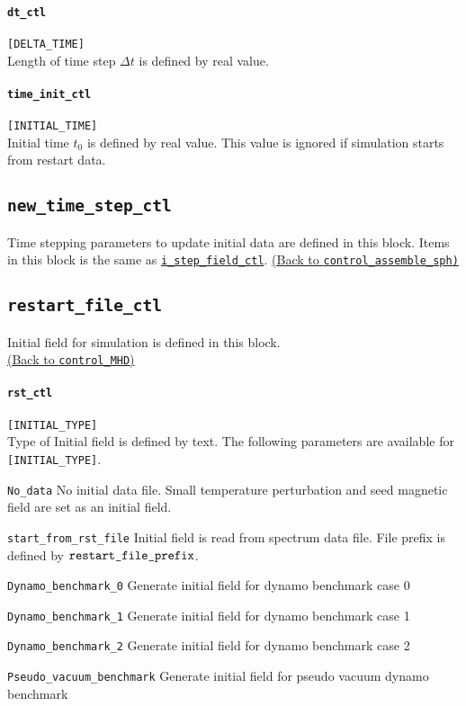 \paragraph{\tt dt\_ctl}
\label{href_t:dt_ctl}
\verb|[DELTA_TIME]| \\
Length of time step $\Delta t$ is defined by real value.

\paragraph{\tt time\_init\_ctl}
\label{href_t:time_init_ctl}
\verb|[INITIAL_TIME]| \\
Initial time $t_{0}$ is defined by real value. This value is ignored if simulation starts from restart data.

\subsection{\tt new\_time\_step\_ctl}
\label{href_t:new_time_step_ctl}
Time stepping parameters to update initial data are defined in this block. Items in this block is the same as \hyperref[href_t:i_step_field_ctl]{\tt i\_step\_field\_ctl}.
\hyperref[href_i:new_time_step_ctl]{(Back to {\tt control\_assemble\_sph)}}


\subsection{\tt restart\_file\_ctl}
\label{href_t:restart_file_ctl}
Initial field for simulation is defined in this block.\\
\hyperref[href_t:restart_file_prefix]{(Back to {\tt control\_MHD})}

\paragraph{\tt rst\_ctl}
\label{href_t:rst_ctl}
\verb|[INITIAL_TYPE]| \\
Type of Initial field is defined by text. The following parameters are available for \verb|[INITIAL_TYPE]|.
%
\begin{description}
\item{\tt No\_data}  No initial data file. Small temperature perturbation and seed magnetic field are set as an initial field.
\item{\tt start\_from\_rst\_file} Initial field is read from spectrum data file. File prefix is defined by \hyperref[href_t:restart_file_prefix]{$\mbox{\tt restart\_file\_prefix}$}.
\item{\tt Dynamo\_benchmark\_0}   Generate initial field for dynamo benchmark case 0
\item{\tt Dynamo\_benchmark\_1}   Generate initial field for dynamo benchmark case 1
\item{\tt Dynamo\_benchmark\_2}   Generate initial field for dynamo benchmark case 2
\item{\tt Pseudo\_vacuum\_benchmark} Generate initial field for pseudo vacuum dynamo benchmark
\end{description}
%

